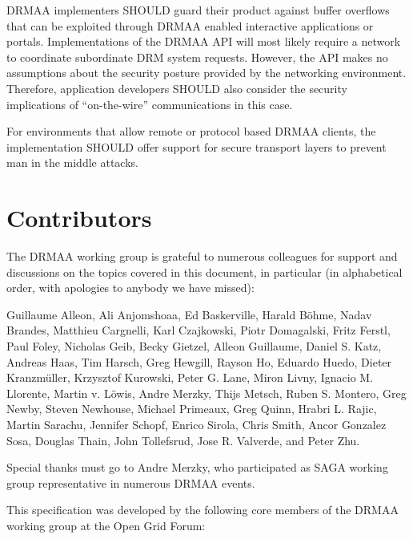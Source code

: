 \documentclass{article}
\begin{document}
DRMAA implementers SHOULD guard their product against buffer overflows that can be exploited through DRMAA enabled interactive applications or portals. Implementations of the DRMAA API will most likely require a network to coordinate subordinate DRM system requests. However, the API makes no assumptions about the security posture provided by the networking environment. Therefore, application developers SHOULD also consider the security implications of \enquote{on-the-wire} communications in this case.

For environments that allow remote or protocol based DRMAA clients, the implementation SHOULD offer support for secure transport layers to prevent man in the middle attacks. 

\section{Contributors}


The DRMAA working group is grateful to numerous colleagues for support and discussions on the topics covered in this document, in particular (in alphabetical order, with apologies to anybody we have missed): 

Guillaume Alleon, 
Ali Anjomshoaa, 
Ed Baskerville, 
Harald Böhme, 
Nadav Brandes,
Matthieu Cargnelli, 
Karl Czajkowski, 
Piotr Domagalski, 
Fritz Ferstl, 
Paul Foley, 
Nicholas Geib, 
Becky Gietzel, 
Alleon Guillaume, 
Daniel S. Katz,
Andreas Haas,
Tim Harsch, 
Greg Hewgill, 
Rayson Ho, 
Eduardo Huedo, 
Dieter Kranzmüller, 
Krzysztof Kurowski, 
Peter G. Lane, 
Miron Livny, 
Ignacio M. Llorente, 
Martin v. Löwis, 
Andre Merzky, 
Thijs Metsch,
Ruben S. Montero, 
Greg Newby, 
Steven Newhouse, 
Michael Primeaux, 
Greg Quinn, 
Hrabri L. Rajic,
Martin Sarachu, 
Jennifer Schopf, 
Enrico Sirola, 
Chris Smith, 
Ancor Gonzalez Sosa, 
Douglas Thain, 
John Tollefsrud, 
Jose R. Valverde, 
and Peter Zhu.

Special thanks must go to Andre Merzky, who participated as SAGA working group representative in numerous DRMAA events. 

This specification was developed by the following core members of the DRMAA working group at the Open Grid Forum:
\end{document}
